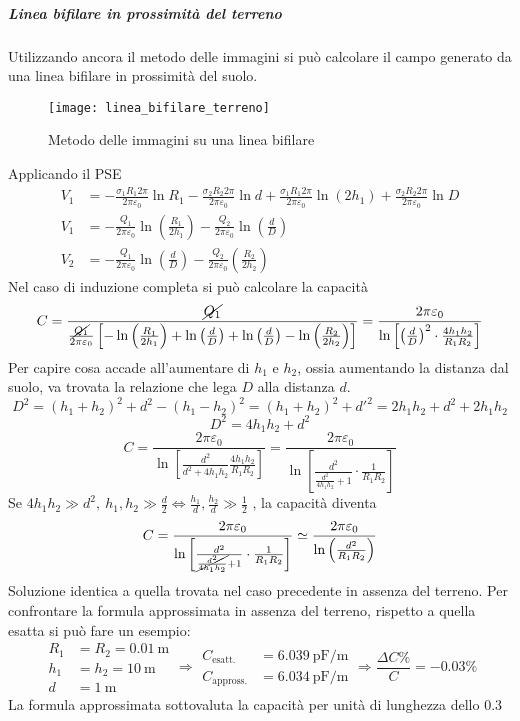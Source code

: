 \subparagraph{Linea bifilare in prossimità del terreno}
Utilizzando ancora il metodo delle immagini si può calcolare il campo generato da una linea
bifilare in prossimità del suolo.
\begin{figure}[H]
\centering
 \texttt{[image: linea\_bifilare\_terreno]}
\caption{Metodo delle immagini su una linea bifilare}
\end{figure} 
Applicando il PSE
\begin{align*}
V_1 &= -\frac{\sigma_1 R_1 2\pi}{2\pi\varepsilon_0}\ln R_1 -
\frac{\sigma_2 R_2 2 \pi}{2 \pi \varepsilon_0}\ln d + 
\frac{\sigma_1 R_1 2 \pi}{2\pi \varepsilon_0} \ln(2 h_1) +
\frac{\sigma_2 R_2 2 \pi}{2\pi\varepsilon_0} \ln D \\
V_1 &= -\frac{Q_1}{2\pi\varepsilon_0} \ln\left(\frac{R_1}{2h_1}\right) - 
\frac{Q_2}{2\pi\varepsilon_0} \ln \left(\frac{d}{D}\right)\\
V_2 &= -\frac{Q_1}{2\pi\varepsilon_0} \ln\left(\frac{d}{D}\right) - 
\frac{Q_2}{2\pi\varepsilon_0} \left(\frac{R_2}{2h_2}\right)
\end{align*}
Nel caso di induzione completa si può calcolare la capacità
$$
C = \frac{\cancel{Q_1}}{\frac{\cancel{Q_1}}{2\pi\varepsilon_0}\left[-\ln\left(\frac{R_1}{2h_1}\right)+\ln\left(\frac{d}{D}\right)+\ln\left(\frac{d}{D}\right)-\ln\left(\frac{R_2}{2h_2}\right)\right]} = 
\frac{2\pi\varepsilon_0}{\ln\left[\left(\frac{d}{D}\right)^2\cdot\frac{4h_1h_2}{R_1R_2}\right]}
$$
Per capire cosa accade all'aumentare di $h_1$ e $h_2$, ossia aumentando
la distanza dal suolo, va trovata la relazione che lega $D$ alla 
distanza $d$.
$$
D^2 = (h_1+h_2)^2 + d^2 - (h_1-h_2)^2 = (h_1+h_2)^2 + d'^2 = 2h_1h_2 + d^2 + 2h_1h_2
$$ 
$$
D^2 = 4h_1h_2+d^2
$$
$$
C = \frac{2\pi\varepsilon_0}{\ln\left[\frac{d^2}{d^2+4h_1h_2} 
\frac{4h_1h_2}{R_1R_2} \right]} = \frac{2\pi\varepsilon_0}
{\ln\left[ \frac{d^2}{\frac{d^2}{4h_1h_2}+1}\cdot\frac{1}{R_1R_2} \right]}
$$
Se $4h_1h_2 \gg d^2,\ h_1,h_2 \gg \frac{d}{2} \Leftrightarrow \frac{h_1}{d},\frac{h_2}{d} \gg \frac{1}{2}$ , la capacità diventa
$$
C =\frac{2\pi\varepsilon_0}
{\ln\left[ \frac{d^2}{\cancel{\frac{d^2}{4h_1h_2}}+1}\cdot\frac{1}{R_1R_2} \right]} \simeq \frac{2\pi\varepsilon_0}{\ln\left(\frac{d^2}{R_1R_2}\right)}
$$
Soluzione identica a quella trovata nel caso precedente in
assenza del terreno.
Per confrontare la formula approssimata in assenza del terreno, rispetto a 
quella esatta si può fare un esempio:
$$
\begin{aligned}
R_1 &= R_2 = \SI{0.01}{\meter}\\
h_1 &= h_2 = \SI{10}{\meter} \\
d &= \SI{1}{\meter}
\end{aligned} \Rightarrow 
\begin{aligned}
C_{\text{esatt.}} &= \SI{6.039}{\pico\farad\per\meter} \\
C_{\text{appross.}} &= \SI{6.034}{\pico\farad\per\meter}
\end{aligned} \Rightarrow
\frac{\Delta C \% }{C} = -0.03 \%
$$
La formula approssimata sottovaluta la capacità per unità di lunghezza
dello 0.3 \textpertenthousand

